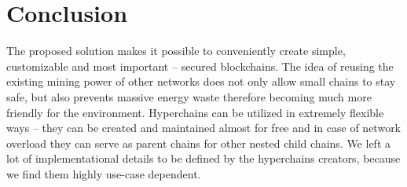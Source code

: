 \section{Conclusion}

The proposed solution makes it possible to conveniently create simple, customizable and most
important – secured blockchains. The idea of reusing the existing mining power
of other networks does not only allow small chains to stay safe, but also
prevents massive energy waste therefore becoming much more friendly for the environment.
Hyperchains can be utilized in extremely flexible ways – they can be created and
maintained almost for free and in case of network overload they can serve as
parent chains for other nested child chains. We left a lot of implementational
details to be defined by the hyperchains creators, because we find them highly
use-case dependent.